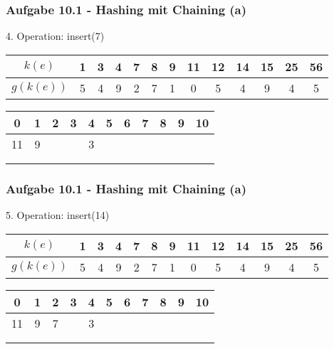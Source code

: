   \begin{frame}
    \frametitle{Aufgabe 10.1 - Hashing mit Chaining (a)}
    4. Operation: insert(7)
    \begin{center}
      \begin{tabular}{c|c|c|c|c|c|c|c|c|c|c|c|c}
        $k(e)$    & 1 & 3 & 4 & 7 & 8 & 9 & 11 & 12 & 14 & 15 & 25 & 56 \\
        \hline
        $g(k(e))$ & 5 & 4 & 9 & 2 & 7 & 1 & 0  & 5  & 4  & 9  & 4  & 5  \\
      \end{tabular}
  
      \bigskip
  
      \begin{tabular}{c|c|c|c|c|c|c|c|c|c|c}
        0  & 1 & 2 & 3 & 4 & 5 & 6 & 7 & 8 & 9 & 10 \\
        \hline
        11 & 9 &   &   & 3 &   &   &   &   &   &    \\
           &   &   &   &   &   &   &   &   &   &    \\
           &   &   &   &   &   &   &   &   &   &    \\
      \end{tabular}
    \end{center}
  \end{frame}
  
  \begin{frame}
    \frametitle{Aufgabe 10.1 - Hashing mit Chaining (a)}
    5. Operation: insert(14)
    \begin{center}
      \begin{tabular}{c|c|c|c|c|c|c|c|c|c|c|c|c}
        $k(e)$    & 1 & 3 & 4 & 7 & 8 & 9 & 11 & 12 & 14 & 15 & 25 & 56 \\
        \hline
        $g(k(e))$ & 5 & 4 & 9 & 2 & 7 & 1 & 0  & 5  & 4  & 9  & 4  & 5  \\
      \end{tabular}
  
      \bigskip
  
      \begin{tabular}{c|c|c|c|c|c|c|c|c|c|c}
        0  & 1 & 2 & 3 & 4 & 5 & 6 & 7 & 8 & 9 & 10 \\
        \hline
        11 & 9 & 7 &   & 3 &   &   &   &   &   &    \\
           &   &   &   &   &   &   &   &   &   &    \\
           &   &   &   &   &   &   &   &   &   &    \\
      \end{tabular}
    \end{center}
  \end{frame}
  
